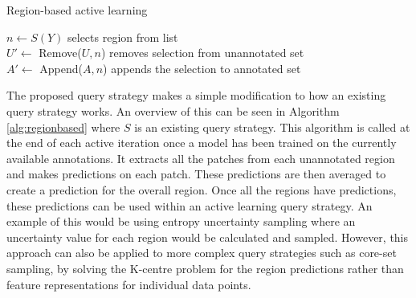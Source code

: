 \begin{algorithm}
	\caption{Region-based active learning}
	\label{alg:regionbased}
	{
		$n \gets S(Y)$ \hfill selects region from list\\
		$U' \gets$ Remove($U, n$) \hfill removes selection from unannotated set\\
		$A' \gets$ Append($A, n$) \hfill appends the selection to annotated set\\
	}
\end{algorithm}

The proposed query strategy makes a simple modification to how an existing query strategy works. An overview of this can be seen in Algorithm \ref{alg:regionbased} where \(S\) is an existing query strategy. This algorithm is called at the end of each active iteration once a model has been trained on the currently available annotations. It extracts all the patches from each unannotated region and makes predictions on each patch. These predictions are then averaged to create a prediction for the overall region. Once all the regions have predictions, these predictions can be used within an active learning query strategy. An example of this would be using entropy uncertainty sampling where an uncertainty value for each region would be calculated and sampled. However, this approach can also be applied to more complex query strategies such as core-set sampling, by solving the K-centre problem for the region predictions rather than feature representations for individual data points.



